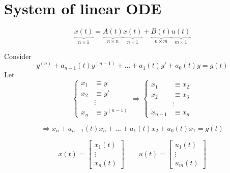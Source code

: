 \documentclass[twoside]{article}
\begin{document}
\section{System of linear ODE}
\begin{equation}
    \underbrace{\dot{x}(t)}_{n \times 1} = \underbrace{A(t)}_{n \times n} \underbrace{x(t)}_{n \times 1} + \underbrace{B(t)}_{n \times m} \underbrace{u(t)}_{m \times 1}
\end{equation}
\begin{remark}
    Consider 
    $$y^{(n)} + a_{n-1}(t)y^{(n-1)}+...+a_{1}(t)y' + a_{0}(t)y = g(t) $$
    Let 
    \[
    \begin{cases}
        x_1 &\equiv y\\
        x_2 &\equiv y'\\
        &\vdots\\
        x_n &\equiv y^{(n-1)}
    \end{cases}
    \Longrightarrow
    \begin{cases}
        \dot{x}_1 &\equiv x_2\\
        \dot{x}_2 &\equiv x_3\\
        &\vdots\\
        \dot{x}_{n-1} &\equiv x_n
    \end{cases}
    \]

    \[  \Longrightarrow
        \dot{x}_n + a_{n-1}(t)x_n+...+a_{1}(t)x_2 + a_{0}(t)x_1 = g(t)
    \]

    \[
    x(t) = \begin{bmatrix}
       x_1(t) \\[0.3em]
       \vdots \\[0.3em]
       x_n(t)      
     \end{bmatrix}
     \qquad
    u(t) = \begin{bmatrix}
       u_1(t) \\[0.3em]
       \vdots \\[0.3em]
       u_m(t)      
     \end{bmatrix}
    \]


\end{remark}
\end{document}
